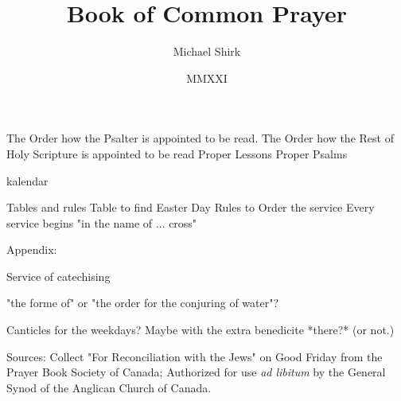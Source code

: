 \documentclass[pottvopaper,11pt,twoside,openany,extrafontsizes,draft]{memoir}
\begin{document}
\frontmatter
\title{Book of Common Prayer}
\author{Michael Shirk}
\date{MMXXI}




\tableofcontents*


The Order how the Psalter is appointed to be read.
The Order how the Rest of Holy Scripture is appointed to be read
Proper Lessons
Proper Psalms


kalendar

Tables and rules
Table to find Easter Day
Rules to Order the service
  Every service begins "in the name of ... cross"

\mainmatter
























% 




Appendix:

Service of catechising

"the forme of" or "the order for the conjuring of water"?


Canticles for the weekdays? Maybe with the extra benedicite *there?* (or not.)

Sources:
Collect "For Reconciliation with the Jews" on Good Friday from the Prayer Book Society of Canada; Authorized for use \emph{ad libitum} by the General Synod of the Anglican Church of Canada.
\end{document}
